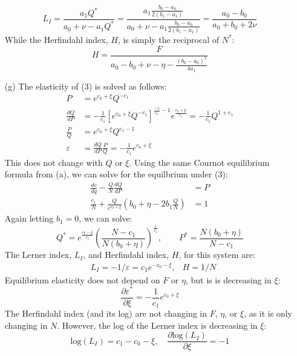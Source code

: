 \documentclass{article}
\newcommand{\loge}[1]{\text{log}\left(#1\right)}
\newcommand{\pl}{\partial}
\begin{document}
\begin{itemize}
\[      L_I = \frac{a_1Q^*}{a_0 + \nu - a_1Q^*} = \frac{a_1\frac{b_0-a_0}{2(b_1-a_1)}}{a_0 + \nu - a_1\frac{b_0-a_0}{2(b_1-a_1)}} = \frac{a_0- b_0}{a_0 + b_0 + 2\nu}
    \]
    While the Herfindahl index, $H$, is simply the reciprocal of $N^*$:\[
      H = \frac{F}{a_0-b_0+\nu-\eta - \frac{(b_0-a_0)^2}{4a_1}}
    \]
    \item[(g)] The elasticity of (3) is solved as follows: \begin{align*}
      P &= e^{c_0 + \xi}Q^{-c_1}  \\
      \frac{dQ}{dP} &= -\frac{1}{c_1}\left[e^{c_0 + \xi}Q^{-c_1}\right]^{\frac{-1}{c_1}-1}e^{\frac{c_0+\xi}{c_1}} = -\frac{1}{c_1}Q^{1+c_1} \\
      \frac{P}{Q} &= e^{c_0 + \xi}Q^{c_1-1}     \\
      \varepsilon &= \frac{dQ}{dP}\frac{P}{Q} = -\frac{1}{c_1}e^{c_0 + \xi}
    \end{align*}
    This does not change with $Q$ or $\xi$. Using the same Cournot equilibrium formula from (a), we can solve for the equilbrium under (3):\begin{align*}
      \frac{dc}{dq} - \frac{Q}{N}\frac{dQ}{dP} &= P \\
      \frac{c_1}{N} + \frac{Q}{e^{c_0 + \xi}}\left(b_0+\eta-2b_1\frac{Q}{N}\right) &= 1
    \end{align*}
    Again letting ${b_1=0}$, we can solve:\[
      Q^* = e^{\frac{c_0-\xi}{c_1}}\left(\frac{N-c_1}{N(b_0+\eta)}\right)^\frac{1}{c_1}, \quad\quad 
      P^* = \frac{N(b_0+\eta)}{N-c_1}
    \]
    The Lerner index, $L_I$, and Herfindahl index, $H$, for this system are:\begin{align*}
      &L_I = -1/\varepsilon = c_1e^{-c_0-\xi}, &H = 1/N
    \end{align*}
    Equilibrium elasticity does not depend on $F$ or $\eta$, but is is decreasing in $\xi$:\[
      \frac{\pl\varepsilon^*}{\pl\xi} = -\frac{1}{c_1}e^{c_0 + \xi}
    \]
    The Herfindahl index (and its log) are not changing in $F$, $\eta$, or $\xi$, as it is only changing in $N$. However, the log of the Lerner index is decreasing in $\xi$:\[
      \loge{L_I} = c_1 - c_0 - \xi,\quad \frac{\pl\loge{L_I}}{\pl\xi} = -1
    \]
\end{itemize}
\end{document}
